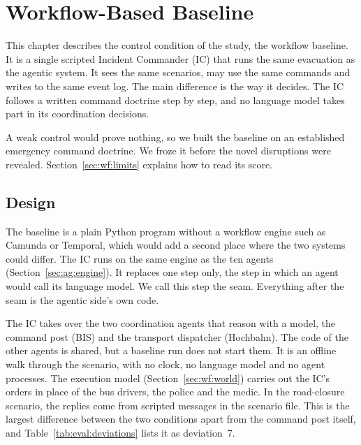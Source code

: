 \chapter{Workflow-Based Baseline}
\label{ch:workflow}


This chapter describes the control condition of the study, the workflow
baseline. It is a single scripted Incident Commander (IC) that runs the same
evacuation as the agentic system. It sees the same scenarios, may use the same
commands and writes to the same event log. The main difference is the way it
decides. The IC follows a written command doctrine step by step, and no
language model takes part in its coordination decisions.

A weak control would prove nothing, so we built the baseline on an established
emergency command doctrine. We froze it before the novel disruptions were
revealed. Section~\ref{sec:wf:limits} explains how to read its score.

\section{Design}
\label{sec:wf:rationale}

The baseline is a plain Python program without a workflow engine such as
Camunda or Temporal, which would add a second place where the two systems
could differ. The IC runs on the same engine as the ten agents
(Section~\ref{sec:ag:engine}). It replaces one step only, the step in which an
agent would call its language model. We call this step the seam. Everything
after the seam is the agentic side's own code.

The IC takes over the two coordination agents that reason with a model, the
command post (BIS) and the transport dispatcher (Hochbahn). The code of the
other agents is shared, but a baseline run does not start them. It is an
offline walk through the scenario, with no clock, no language model and no agent
processes. The execution model (Section~\ref{sec:wf:world}) carries out the
IC's orders in place of the bus drivers, the police and the medic. In the
road-closure scenario, the replies come from scripted messages in the scenario
file. This is the largest difference between the two conditions apart from the
command post itself, and Table~\ref{tab:eval:deviations} lists it as
deviation~7.

